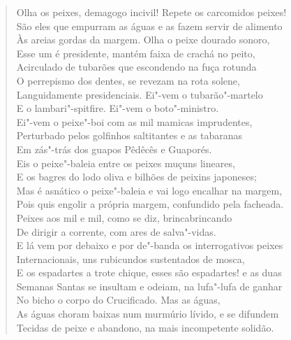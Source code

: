 \begin{verse}
Olha os peixes, demagogo incivil! Repete os carcomidos peixes!\\
São eles que empurram as águas e as fazem servir de alimento\\
Às areias gordas da margem. Olha o peixe dourado sonoro,\\
Esse um é presidente, mantém faixa de crachá no peito,\\
Acirculado de tubarões que escondendo na fuça rotunda\\
O perrepismo dos dentes, se revezam na rota solene,\\
Languidamente presidenciais. Ei"-vem o tubarão"-martelo\\
E o lambari"-spitfire. Ei"-vem o boto"-ministro.\\
Ei"-vem o peixe"-boi com as mil mamicas imprudentes,\\
Perturbado pelos golfinhos saltitantes e as tabaranas\\
Em zás"-trás dos guapos Pêdêcês e Guaporés.\\
Eis o peixe"-baleia entre os peixes muçuns lineares,\\
E os bagres do lodo oliva e bilhões de peixins japoneses;\\
Mas é asnático o peixe"-baleia e vai logo encalhar na margem,\\
Pois quis engolir a própria margem, confundido pela facheada.\\
Peixes aos mil e mil, como se diz, brincabrincando\\
De dirigir a corrente, com ares de salva"-vidas.\\
E lá vem por debaixo e por de"-banda os interrogativos peixes\\
Internacionais, uns rubicundos sustentados de mosca,\\
E os espadartes a trote chique, esses são espadartes! e as duas\\
Semanas Santas se insultam e odeiam, na lufa"-lufa de ganhar\\
No bicho o corpo do Crucificado. Mas as águas,\\
As águas choram baixas num murmúrio lívido, e se difundem\\
Tecidas de peixe e abandono, na mais incompetente solidão.


\end{verse}
